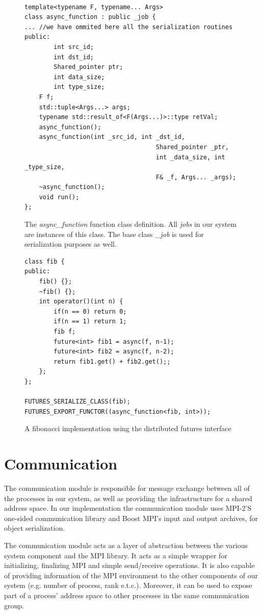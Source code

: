 \begin{figure}[!ht]
\begin{lstlisting}

template<typename F, typename... Args>
class async_function : public _job {
... //we have ommited here all the serialization routines
public:
		int src_id;
		int dst_id;
		Shared_pointer ptr;
		int data_size;
		int type_size;
    F f;
  	std::tuple<Args...> args;
    typename std::result_of<F(Args...)>::type retVal;
    async_function();
    async_function(int _src_id, int _dst_id, 
									Shared_pointer _ptr, 
									int _data_size, int _type_size,
									F& _f, Args... _args);
    ~async_function();
    void run();
};
\end{lstlisting}
\caption{The \emph{async\_function} function class definition.  All \emph{jobs} in our system are
instances of this class.  The base class \emph{\_job} is used for serialization purposes as well.}
\label{lst:async_function}
\end{figure}

\begin{figure}[!ht]
\begin{lstlisting}
class fib {
public:
	fib() {};
	~fib() {};
	int	operator()(int n) {
		if(n == 0) return 0;
		if(n == 1) return 1;
		fib f;
		future<int> fib1 = async(f, n-1);
		future<int> fib2 = async(f, n-2);
		return fib1.get() + fib2.get();;
	};
};

FUTURES_SERIALIZE_CLASS(fib);
FUTURES_EXPORT_FUNCTOR((async_function<fib, int>));

\end{lstlisting}
\caption{A fibonacci implementation using the distributed futures interface}
\label{lst:fib}
\end{figure}



\section{Communication}
\label{sect:communication}
The communication module is responsible for message exchange between all of the processes in our system,
as well as providing the infrastructure for a shared address space.
In our implementation the communication module uses MPI-2'S one-sided communication library and Boost MPI's
input and output archives, for object serialization.

The communication module acts as a layer of abstraction between the various system component and the MPI library.
It acts as a simple wrapper for initializing, finalizing MPI and simple send/receive operations.
It is also capable of providing information of the MPI environment to the other components of our system (e.g.
number of process, rank e.t.c.).  Moreover, it can be used to expose part of a process' address space to other 
processes in the same communication group.  

